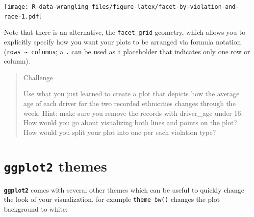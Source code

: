 \documentclass[]{book}
\newenvironment{Shaded}{\begin{snugshade}}{\end{snugshade}}
\newcommand{\KeywordTok}[1]{\textcolor[rgb]{0.13,0.29,0.53}{\textbf{#1}}}
\newcommand{\DataTypeTok}[1]{\textcolor[rgb]{0.13,0.29,0.53}{#1}}
\newcommand{\StringTok}[1]{\textcolor[rgb]{0.31,0.60,0.02}{#1}}
\newcommand{\OtherTok}[1]{\textcolor[rgb]{0.56,0.35,0.01}{#1}}
\newcommand{\OperatorTok}[1]{\textcolor[rgb]{0.81,0.36,0.00}{\textbf{#1}}}
\newcommand{\NormalTok}[1]{#1}
\theoremstyle{definition}
\theoremstyle{definition}
\theoremstyle{definition}
\theoremstyle{remark}
\begin{document}
\texttt{[image: R-data-wrangling\_files/figure-latex/facet-by-violation-and-race-1.pdf]}

Note that there is an alternative, the \texttt{facet\_grid} geometry,
which allows you to explicitly specify how you want your plots to be
arranged via formula notation
(\texttt{rows\ \textasciitilde{}\ columns}; a \texttt{.} can be used as
a placeholder that indicates only one row or column).

\begin{quote}
Challenge

Use what you just learned to create a plot that depicts how the average
age of each driver for the two recorded ethnicities changes through the
week. Hint: make sure you remove the records with driver\_age under 16.
How would you go about visualizing both lines and points on the plot?
How would you split your plot into one per each violation type?
\end{quote}

\section{\texorpdfstring{\textbf{\texttt{ggplot2}}
themes}{ggplot2 themes}}\label{ggplot2-themes}

\textbf{\texttt{ggplot2}} comes with several other themes which can be
useful to quickly change the look of your visualization, for example
\texttt{theme\_bw()} changes the plot background to white:

\begin{Shaded}
\end{Shaded}
\end{document}
